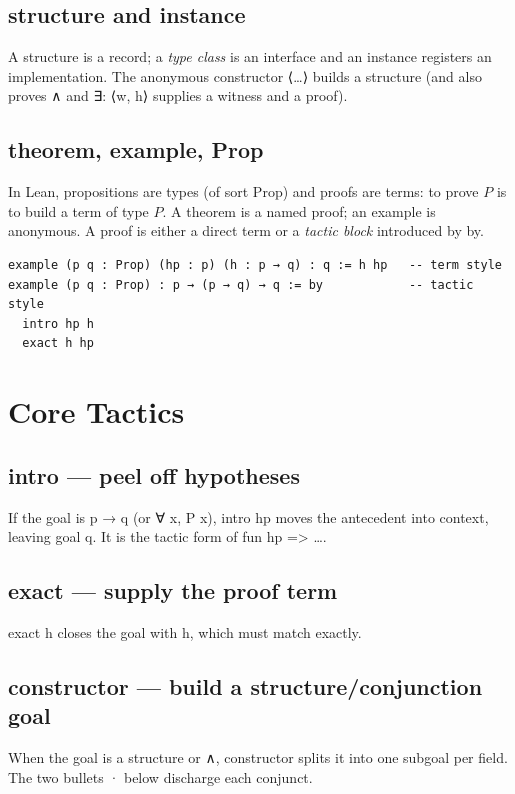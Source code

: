 \documentclass[11pt, a4paper, oneside]{book}
\newcommand{\li}[1]{{\ttfamily\small\color{deepblue}#1}}
\begin{document}
\subsection*{\li{structure} and \li{instance}}
A \li{structure} is a record; a \emph{type class} is an interface and an
\li{instance} registers an implementation.  The anonymous constructor
\li{⟨\ldots⟩} builds a structure (and also proves \li{∧} and \li{∃}: \li{⟨w, h⟩}
supplies a witness and a proof).

\subsection*{\li{theorem}, \li{example}, \li{Prop}}
In Lean, propositions are types (of sort \li{Prop}) and proofs are terms: to
prove $P$ is to build a term of type $P$.  A \li{theorem} is a named proof; an
\li{example} is anonymous.  A proof is either a direct term or a
\emph{tactic block} introduced by \li{by}.

\begin{leanbox}
\begin{verbatim}
example (p q : Prop) (hp : p) (h : p → q) : q := h hp   -- term style
example (p q : Prop) : p → (p → q) → q := by            -- tactic style
  intro hp h
  exact h hp
\end{verbatim}
\end{leanbox}

\section{Core Tactics}

\subsection*{\li{intro} --- peel off hypotheses}
If the goal is \li{p → q} (or \li{∀ x, P x}), \li{intro hp} moves the antecedent
into context, leaving goal \li{q}.  It is the tactic form of \li{fun hp => …}.

\subsection*{\li{exact} --- supply the proof term}
\li{exact h} closes the goal with \li{h}, which must match exactly.

\subsection*{\li{constructor} --- build a structure/conjunction goal}
When the goal is a structure or \li{∧}, \li{constructor} splits it into one
subgoal per field.  The two bullets \li{·} below discharge each conjunct.
\end{document}

